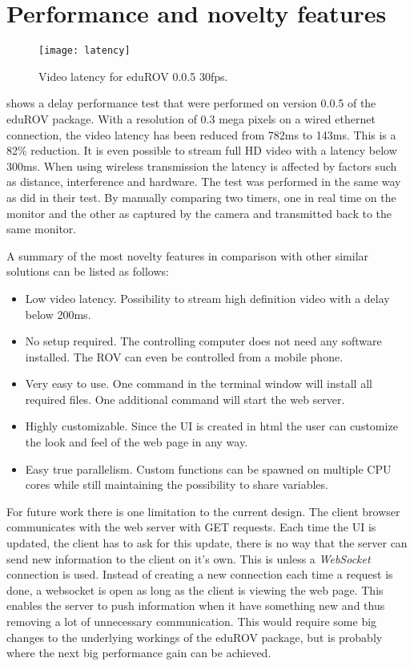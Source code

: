 \section{Performance and novelty features}

\begin{figure}[h!]
    \centering
    \texttt{[image: latency]}
    \caption{Video latency for eduROV 0.0.5 \@ 30fps.}
    \label{latency}
\end{figure}

 shows a delay performance test that were performed on version 0.0.5 of the eduROV package. With a resolution of 0.3 mega pixels on a wired ethernet connection, the video latency has been reduced from 782ms to 143ms. This is a 82\% reduction. It is even possible to stream full HD video with a latency below 300ms. When using wireless transmission the latency is affected by factors such as distance, interference and hardware. The test was performed in the same way as \citet{Jennhag2016} did in their test. By manually comparing two timers, one in real time on the monitor and the other as captured by the camera and transmitted back to the same monitor.

A summary of the most novelty features in comparison with other similar solutions can be listed as follows:

\begin{itemize}
\item Low video latency. Possibility to stream high definition video with a delay below 200ms.

\item No setup required. The controlling computer does not need any software installed. The ROV can even be controlled from a mobile phone.

\item Very easy to use. One command in the terminal window will install all required files. One additional command will start the web server.

\item Highly customizable. Since the UI is created in html the user can customize the look and feel of the web page in any way.

\item Easy true parallelism. Custom functions can be spawned on multiple CPU cores while still maintaining the possibility to share variables.

\end{itemize}

For future work there is one limitation to the current design. The client browser communicates with the web server with GET requests. Each time the UI is updated, the client has to ask for this update, there is no way that the server can send new information to the client on it's own. This is unless a \emph{WebSocket} connection is used. Instead of creating a new connection each time a request is done, a websocket is open as long as the client is viewing the web page. This enables the server to push information when it have something new and thus removing a lot of unnecessary communication. This would require some big changes to the underlying workings of the eduROV package, but is probably where the next big performance gain can be achieved.